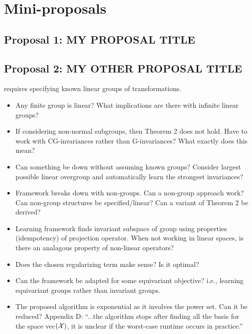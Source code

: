 

\section{Mini-proposals}

\subsection{Proposal 1: MY PROPOSAL TITLE} %


\subsection{Proposal 2: MY OTHER PROPOSAL TITLE} %



\parencite{Mouli:2021} requires specifying known linear groups of transformations.
\begin{itemize}

\item
Any finite group is linear? What implications are there with infinite linear groups?

\item
If considering non-normal subgroups, then Theorem 2 does not hold. Have to work with CG-invariances rather than G-invariances? What exactly does this mean?

\item
Can something be down without assuming known groups? Consider largest possible linear overgroup and automatically learn the strongest invariances?

\item
Framework breaks down with non-groups. Can a non-group approach work? Can non-group structures be specified/linear? Can a variant of Theorem 2 be derived?

\item
Learning framework finds invariant subspace of group using properties (idempotency) of projection operator. When not working in linear spaces, is there an analagous property of non-linear operators?

\item
Does the chosen regularizing term make sense? Is it optimal?

\item
Can the framework be adapted for some equivariant objective? i.e., learning equivariant groups rather than invariant groups.

\item
The proposed algorithm is exponential as it involves the power set. Can it be reduced? Appendix D: ``...the algorithm stops after finding all the basis for the space vec$(\mathcal{X})$, it is unclear if the worst-case runtime occurs in practice.''

\end{itemize}